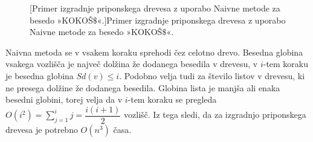 \begin{figure}[htb]
\begin{subfigure}[t]{0.3\linewidth}
        
        \centering
        \label{fig:Naivna1}
    \end{subfigure}
    \hspace{0.5cm}
    \begin{subfigure}[t]{0.3\linewidth}
        
        \centering
        \label{fig:Naivna2}
    \end{subfigure}
    \hspace{0.5cm}
    \begin{subfigure}[t]{0.3\linewidth}
        
        \centering
        \label{fig:Naivna3}
    \end{subfigure}
    \par\bigskip 
    \begin{subfigure}[t]{0.3\linewidth}
        
        \centering
        \label{fig:Naivna4}
    \end{subfigure}
    \hspace{0.5cm}
    \begin{subfigure}[t]{0.3\linewidth}
        
        \centering
        \label{fig:Naivna5}
    \end{subfigure}
    \hspace{0.5cm}
    \begin{subfigure}[t]{0.3\textwidth}
        
        \centering
        \label{fig:Naivna6}
    \end{subfigure}

       [Primer izgradnje priponskega drevesa z uporabo Naivne metode za besedo »KOKOŠ$\$$«.]{Primer izgradnje priponskega drevesa z uporabo Naivne metode za besedo »KOKOŠ$\$$«.} 
        \label{fig:Naivna}
\end{figure}

Naivna metoda se v vsakem koraku sprehodi čez celotno drevo. Besedna globina vsakega vozlišča je največ dolžina že dodanega besedila v drevesu, v $i$-tem koraku je besedna globina $\textit{Sd}(v)\le i$. Podobno velja tudi za število listov v drevesu, ki ne presega dolžine že dodanega besedila. Globina lista je manjša ali enaka besedni globini, torej velja da v $i$-tem koraku se pregleda $O(i^2)=\sum_{j=1}^i j=  \dfrac{i(i+1)}{2}$ vozlišč. Iz tega sledi, da za izgradnjo priponskega drevesa je potrebno $O(n^3)$ časa.


